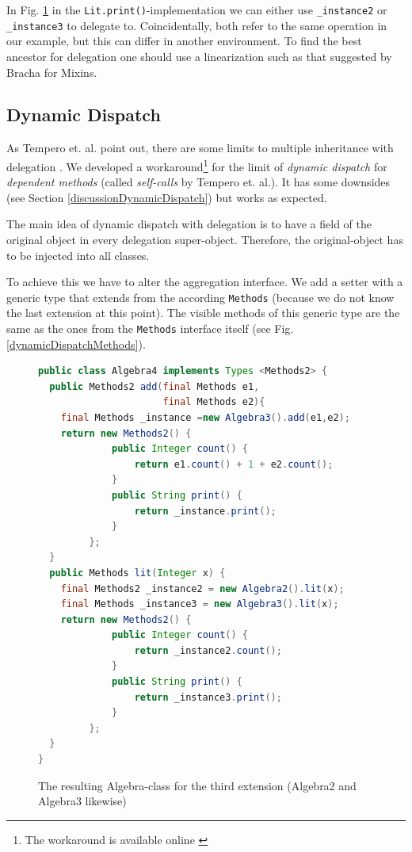 \documentclass{report}
\begin{document}
In Fig. \ref{algebraImplementation} in the \lstinline{Lit.print()}-implementation we can either use \lstinline{_instance2} or \lstinline{_instance3} to delegate to. Coincidentally, both refer to the same operation in our example, but this can differ in another environment. To find the best ancestor for delegation one should use a linearization such as that suggested by Bracha \cite{Bracha-Mixin-1990} for Mixins.

\subsection{Dynamic Dispatch}
\label{dynamicDispatch}

As Tempero et. al. point out, there are some limits to multiple inheritance with delegation \cite{Tempero-Multiple-2000}. We developed a workaround\footnote{The workaround is available online \cite{Peuscher-GitHub-EP-2014}} for the limit of \emph{dynamic dispatch} for \emph{dependent methods} (called \emph{self-calls} by Tempero et. al.). It has some downsides (see Section \ref{discussionDynamicDispatch}) but works as expected.

The main idea of dynamic dispatch with delegation is to have a field of the original object in every delegation super-object. Therefore, the original-object has to be injected into all classes.

To achieve this we have to alter the aggregation interface. We add a setter with a generic type that extends from the according \lstinline{Methods} (because we do not know the last extension at this point). The visible methods of this generic type are the same as the ones from the \lstinline{Methods} interface itself (see Fig. \ref{dynamicDispatchMethods}).

\begin{figure}[H]
\begin{lstlisting}[language=java]
public class Algebra4 implements Types <Methods2> {
  public Methods2 add(final Methods e1,
                      final Methods e2){
    final Methods _instance =new Algebra3().add(e1,e2);
    return new Methods2() {
             public Integer count() {
                 return e1.count() + 1 + e2.count();
             }
             public String print() {
                 return _instance.print();
             }
         };
  }
  public Methods lit(Integer x) { 
    final Methods2 _instance2 = new Algebra2().lit(x);
    final Methods _instance3 = new Algebra3().lit(x);
    return new Methods2() {
             public Integer count() { 
                 return _instance2.count();
             }
             public String print() { 
                 return _instance3.print();
             }
         };
  }
}
\end{lstlisting}
\caption{The resulting Algebra-class for the third extension (Algebra2 and Algebra3 likewise)}
\label{algebraImplementation}
\end{figure}
\end{document}
